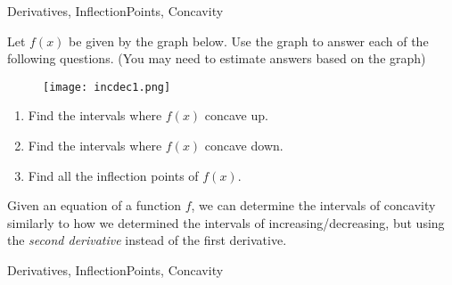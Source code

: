 \begin{tagblock}{Derivatives, InflectionPoints, Concavity}
\begin{question}

Let $f(x)$ be given by the graph below.  Use the graph to answer each of the following questions. (You may need to estimate answers based on the graph)
\begin{figure}[h]
\centering
\texttt{[image: incdec1.png]} 
\end{figure}

\begin{enumerate}
\item Find the intervals where $f(x)$ concave up.  

\vspace{.75in}
\item Find the intervals where $f(x)$ concave down.
\vspace{.75in}

\item Find all the inflection points of $f(x)$.   
\vspace{.75in}

\end{enumerate}



Given an equation of a function $f$, we can determine the intervals of concavity similarly to how we determined the intervals of increasing/decreasing, but using the \emph{second derivative} instead of the first derivative.



	
\begin{tags}
	   Derivatives, InflectionPoints, Concavity
\end{tags}
	
\begin{diary}
\end{diary}
	
\begin{solution}
	   
\end{solution}
	
\end{question}

\end{tagblock}


